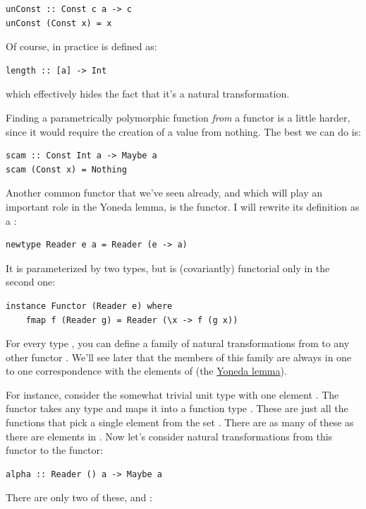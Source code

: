 \begin{verbatim}
unConst :: Const c a -> c
unConst (Const x) = x
\end{verbatim}
Of course, in practice  is defined as:

\begin{verbatim}
length :: [a] -> Int
\end{verbatim}
which effectively hides the fact that it's a natural transformation.

Finding a parametrically polymorphic function \emph{from} a
 functor is a little harder, since it would require the
creation of a value from nothing. The best we can do is:

\begin{verbatim}
scam :: Const Int a -> Maybe a
scam (Const x) = Nothing
\end{verbatim}
Another common functor that we've seen already, and which will play an
important role in the Yoneda lemma, is the  functor. I
will rewrite its definition as a :

\begin{verbatim}
newtype Reader e a = Reader (e -> a)
\end{verbatim}
It is parameterized by two types, but is (covariantly) functorial only
in the second one:

\begin{verbatim}
instance Functor (Reader e) where
    fmap f (Reader g) = Reader (\x -> f (g x))
\end{verbatim}
For every type , you can define a family of natural
transformations from  to any other functor .
We'll see later that the members of this family are always in one to one
correspondence with the elements of  (the
\hyperref[the-yoneda-lemma]{Yoneda lemma}).

For instance, consider the somewhat trivial unit type \code{()} with
one element \code{()}. The functor  takes any type
 and maps it into a function type .
These are just all the functions that pick a single element from the set
. There are as many of these as there are elements in
. Now let's consider natural transformations from this functor
to the  functor:

\begin{verbatim}
alpha :: Reader () a -> Maybe a
\end{verbatim}
There are only two of these,  and :

